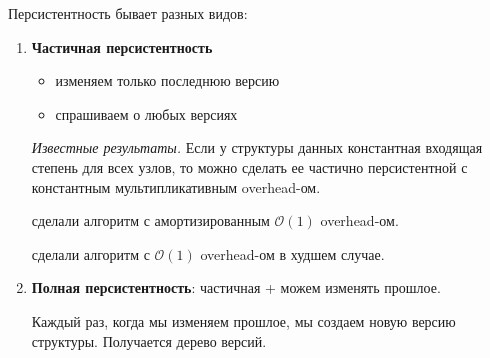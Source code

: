 Персистентность бывает разных видов:

\begin{enumerate}

\item {\bf Частичная персистентность}

\begin{itemize}

\item изменяем только последнюю версию
\item спрашиваем о любых версиях

\end{itemize}

\vspace{10pt}

{\it Известные результаты.} Если у структуры данных константная входящая степень для всех узлов, то можно сделать ее частично персистентной с константным мультипликативным overhead-ом.

\cite{driscoll1986making} сделали алгоритм с амортизированным $\mathcal{O}(1)$ overhead-ом.

\cite{brodal1996partially} сделали алгоритм с $\mathcal{O}(1)$ overhead-ом в худшем случае.

\item \label{item:fullPers} {\bf Полная персистентность}: частичная + можем изменять прошлое.

Каждый раз, когда мы изменяем прошлое, мы создаем новую версию структуры. Получается дерево версий.

\begin{figure}[h] \centering
{}
\end{figure}


\end{enumerate}

